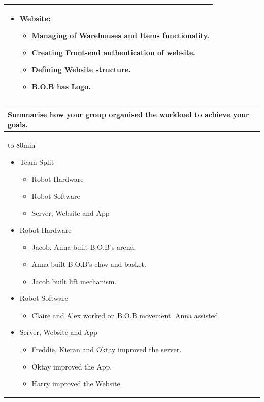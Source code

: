 \documentclass[a4paper]{article}
\newcommand{\colWidth}{141mm}
\begin{document}
\begin{center}
\begin{tabular}{|p{\colWidth}|}
{\begin{itemize}
\begin{itemize}
        \item More realistic User Interface.
    \end{itemize}
    \item Website: 
    \begin{itemize}
        \item Managing of Warehouses and Items functionality.
        \item Creating Front-end authentication of website. 
        \item Defining Website structure.
        \item B.O.B has Logo.
    \end{itemize}
\end{itemize}
  }
  \\
  \hline
\end{tabular}
\vskip 5mm


\begin{tabular}{|p{\colWidth}|}
	\hline
	\cellcolor{blue!25}\large
	\textbf{Summarise how your group organised the workload to achieve your goals.}
	\\ \hline
	\vtop to 80mm{
	\begin{itemize}
	    \item Team Split
	    \begin{itemize}
	        \item Robot Hardware
	        \item Robot Software
	        \item Server, Website and App 
	    \end{itemize}
	    \item Robot Hardware
	    \begin{itemize}
	        \item Jacob, Anna built B.O.B's arena.
	        \item Anna built B.O.B's claw and basket.
	        \item Jacob built lift mechanism.
	    \end{itemize}
	    \item Robot Software
	    \begin{itemize}
	        \item Claire and Alex worked on B.O.B movement. Anna assisted. 
	    \end{itemize}
	    \item Server, Website and App 
	    \begin{itemize}
	        \item Freddie, Kieran and Oktay improved the server.
	        \item Oktay improved the App.
	        \item Harry improved the Website.
	    \end{itemize}
	\end{itemize}
  }
  \\
  \hline
\end{tabular}
\vskip 5mm


\end{center}
\end{document}
